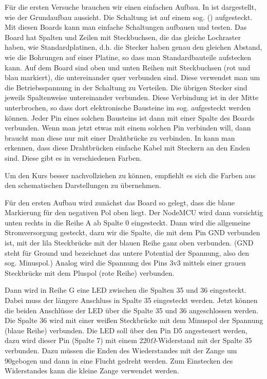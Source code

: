 \begin{multicols}{2}

\vfill\null\pagebreak
{}
%
%
%
Für die ersten Versuche brauchen wir einen einfachen Aufbau. In  ist dargestellt, wie der Grundaufbau aussieht. Die Schaltung ist auf einem
sog.  () aufgesteckt. Mit diesen Boards kann man einfache Schaltungen aufbauen und testen. 
Das Board hat Spalten und Zeilen mit Steckbuchsen, die das gleiche Lochraster haben, wie Standardplatinen, d.h. die Stecker haben genau den gleichen
Abstand, wie die Bohrungen auf einer Platine, so dass man Standardbauteile aufstecken kann.
Auf dem Board sind oben und unten Reihen mit Steckbuchsen (rot und blau markiert), die untereinander quer verbunden sind. 
Diese verwendet man um die Betriebsspannung in der
Schaltung zu Verteilen. Die übrigen Stecker sind jeweils Spaltenweise untereinander verbunden. Diese Verbindung ist in der Mitte unterbrochen, so dass dort 
elektronische Bausteine im sog.  aufgesteckt werden können. Jeder Pin eines solchen Bausteins ist dann mit einer Spalte des Boards verbunden.
Wenn man jetzt etwas mit einem solchen Pin verbinden will, dann braucht man diese nur mit einer Drahtbrücke zu verbinden. 
In  kann man erkennen, dass diese Drahtbrücken einfache Kabel mit Steckern an den Enden sind. 
Diese gibt es in verschiedenen Farben.

\vfill\null\pagebreak
{}

Um den Kurs besser nachvollziehen zu können, empfiehlt es sich die Farben aus den schematischen Darstellungen zu übernehmen.

Für den ersten Aufbau wird zunächst das Board so gelegt, dass die blaue Markierung für den negativen Pol oben liegt. Der NodeMCU wird dann vorsichtig 
unten rechts in die Reihe A ab Spalte 0 eingesteckt. Dann wird die allgemeine Stromversorgung gesteckt, dazu wir die Spalte, die mit dem Pin GND verbunden ist,
mit der lila Steckbrücke mit der blauen Reihe ganz oben verbunden. (GND steht für Ground und bezeichnet das untere Potential der Spannung, also den
sog. Minuspol.) Analog wird die Spannung des Pins 3v3 mittels einer grauen Steckbrücke mit dem Pluspol (rote Reihe) verbunden.

Dann wird in Reihe G eine LED zwischen die Spalten 35 und 36 eingesteckt. Dabei muss der längere Anschluss in Spalte 35 eingesteckt werden. Jetzt können die beiden
Anschlüsse der LED über die Spalte 35 und 36 angeschlossen werden. Die Spalte 36 wird mit einer weißen Steckbrücke mit dem Minuspol der Spannung (blaue Reihe) 
verbunden. Die LED soll über den Pin D5 angesteuert werden, dazu wird dieser Pin (Spalte 7) mit einem 220$\Omega$-Widerstand mit der Spalte 35 verbunden. Dazu müssen
die Enden des Wiederstandes mit der Zange um 90\textdegree  gebogen und dann in eine Flucht gedreht werden. Zum Einstecken des Widerstandes kann die kleine Zange
verwendet werden.


\end{multicols}
